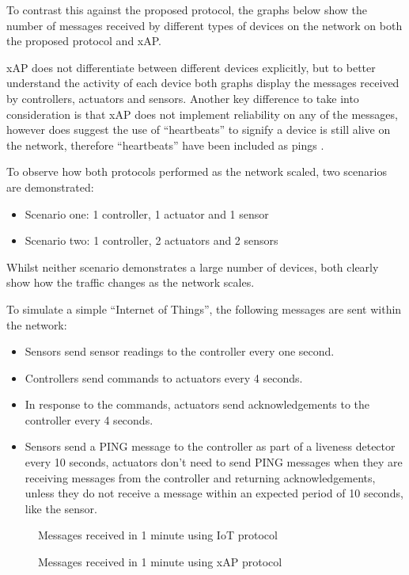 To contrast this against the proposed protocol, the graphs below show the number of messages received by different types of devices on the network on both the proposed protocol and xAP.

xAP does not differentiate between different devices explicitly, but to better understand the activity of each device both graphs display the messages received by controllers, actuators and sensors. Another key difference to take into consideration is that xAP does not implement reliability on any of the messages, however does suggest the use of ``heartbeats'' to signify a device is still alive on the network, therefore ``heartbeats'' have been included as pings \cite{xAPHeartBeats}.

To observe how both protocols performed as the network scaled, two scenarios are demonstrated:\vspace{-5mm} 
\begin{itemize}
    \item Scenario one: 1 controller, 1 actuator and 1 sensor
    \item Scenario two: 1 controller, 2 actuators and 2 sensors
\end{itemize}
Whilst neither scenario demonstrates a large number of devices, both clearly show how the traffic changes as the network scales.

To simulate a simple ``Internet of Things'', the following messages are sent within the network:\vspace{-5mm} 
\begin{itemize}
    \item Sensors send sensor readings to the controller every one second.
    \item Controllers send commands to actuators every 4 seconds.
    \item In response to the commands, actuators send acknowledgements to the controller every 4 seconds.
    \item Sensors send a PING message to the controller as part of a liveness detector every 10 seconds, actuators don't need to send PING messages when they are receiving messages from the controller and returning acknowledgements, unless they do not receive a message within an expected period of 10 seconds, like the sensor. 
\end{itemize}

\begin{figure}[h]
\begin{center}
\begin{minipage}{.5\textwidth}

\caption{Messages received in 1 minute using IoT protocol}
\label{graph:IoT1}
\end{minipage}%
\begin{minipage}{.5\textwidth}

\caption{Messages received in 1 minute using xAP protocol}
\label{graph:xAP1}
\end{minipage}
\end{center}
\end{figure}

